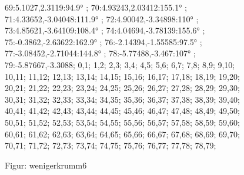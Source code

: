 \documentclass[a4paper,10pt,ngerman]{scrartcl}
\begin{document}
\begin{algorithm}[H]
\begin{figure}[!h]
{                69:5.1027,2.3119:94.9° ;
                70:4.93243,2.03412:155.1° ;
                71:4.33652,-3.04048:111.9° ;
                72:4.90042,-3.34898:110° ;
                73:4.85621,-3.64109:108.4° ;
                74:4.04694,-3.78139:155.6° ;
                75:-0.3862,-2.63622:162.9° ;
                76:-2.14394,-1.55585:97.5° ;
                77:-3.08452,-2.71044:144.8° ;
                78:-5.77488,-3.467:107° ;
                79:-5.87667,-3.3088;
            }{
                0,1;
                1,2;
                2,3;
                3,4;
                4,5;
                5,6;
                6,7;
                7,8;
                8,9;
                9,10;
                10,11;
                11,12;
                12,13;
                13,14;
                14,15;
                15,16;
                16,17;
                17,18;
                18,19;
                19,20;
                20,21;
                21,22;
                22,23;
                23,24;
                24,25;
                25,26;
                26,27;
                27,28;
                28,29;
                29,30;
                30,31;
                31,32;
                32,33;
                33,34;
                34,35;
                35,36;
                36,37;
                37,38;
                38,39;
                39,40;
                40,41;
                41,42;
                42,43;
                43,44;
                44,45;
                45,46;
                46,47;
                47,48;
                48,49;
                49,50;
                50,51;
                51,52;
                52,53;
                53,54;
                54,55;
                55,56;
                56,57;
                57,58;
                58,59;
                59,60;
                60,61;
                61,62;
                62,63;
                63,64;
                64,65;
                65,66;
                66,67;
                67,68;
                68,69;
                69,70;
                70,71;
                71,72;
                72,73;
                73,74;
                74,75;
                75,76;
                76,77;
                77,78;
                78,79;
            }
            \caption{Figur: wenigerkrumm6}
            \label{fig:wenigerkrumm6}
        \end{figure}
        \newpage



\end{algorithm}
\end{document}
